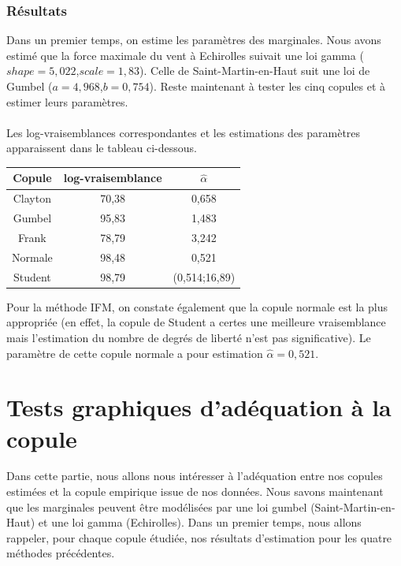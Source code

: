 \subsubsection{Résultats}

Dans un premier temps, on estime les paramètres des marginales. Nous avons estimé que la force maximale du vent à Echirolles suivait une loi gamma ($shape=5,022$,$scale=1,83$). Celle de Saint-Martin-en-Haut suit une loi de Gumbel ($a =4,968$,$b = 0,754$). Reste maintenant à tester les cinq copules et à estimer leurs paramètres.
\\ \\
 Les log-vraisemblances correspondantes et les estimations des paramètres apparaissent dans le tableau ci-dessous.

\begin{center}
\begin{tabular}{|c|c|c|}
\hline 
Copule & log-vraisemblance &  $\hat{\alpha}$ \\
\hline
Clayton & 70,38 & 0,658 \\
\hline
Gumbel & 95,83 & 1,483 \\
\hline
Frank & 78,79 & 3,242 \\
\hline
Normale &  98,48 & 0,521 \\
\hline
Student & 98,79 & (0,514;16,89)  \\
\hline
\end{tabular}
\end{center}

Pour la méthode IFM, on constate également que la copule normale est la plus appropriée (en effet, la copule de Student a certes une meilleure vraisemblance mais l'estimation du nombre de degrés de liberté n'est pas significative). Le paramètre de cette copule normale a pour estimation $\hat{\alpha}=0,521$.

\section{Tests graphiques d'adéquation à la copule}

Dans cette partie, nous allons nous intéresser à l'adéquation entre nos copules estimées et la copule empirique issue de nos données. Nous savons maintenant que les marginales peuvent être modélisées par une loi gumbel (Saint-Martin-en-Haut) et une loi gamma (Echirolles). Dans un premier temps, nous allons rappeler, pour chaque copule étudiée, nos résultats d'estimation pour les quatre méthodes précédentes. 

